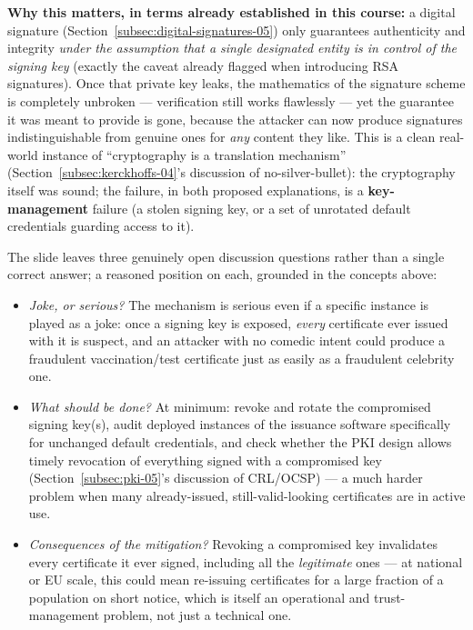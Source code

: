 \documentclass[12pt, a4paper]{article}
\begin{document}
\textcolor{red!70!black}{\textbf{Why this matters, in terms already established in this course:}} a digital signature (Section~\ref{subsec:digital-signatures-05}) only guarantees authenticity and integrity \emph{under the assumption that a single designated entity is in control of the signing key} (exactly the caveat already flagged when introducing RSA signatures). Once that private key leaks, the mathematics of the signature scheme is completely unbroken --- verification still works flawlessly --- yet the guarantee it was meant to provide is gone, because the attacker can now produce signatures indistinguishable from genuine ones for \emph{any} content they like. This is a clean real-world instance of ``cryptography is a translation mechanism'' (Section~\ref{subsec:kerckhoffs-04}'s discussion of no-silver-bullet): the cryptography itself was sound; the failure, in both proposed explanations, is a \textbf{key-management} failure (a stolen signing key, or a set of unrotated default credentials guarding access to it).

The slide leaves three genuinely open discussion questions rather than a single correct answer; a reasoned position on each, grounded in the concepts above:
\begin{itemize}
    \item \textit{Joke, or serious?} The mechanism is serious even if a specific instance is played as a joke: once a signing key is exposed, \emph{every} certificate ever issued with it is suspect, and an attacker with no comedic intent could produce a fraudulent vaccination/test certificate just as easily as a fraudulent celebrity one.
    \item \textit{What should be done?} At minimum: revoke and rotate the compromised signing key(s), audit deployed instances of the issuance software specifically for unchanged default credentials, and check whether the PKI design allows timely revocation of everything signed with a compromised key (Section~\ref{subsec:pki-05}'s discussion of CRL/OCSP) --- a much harder problem when many already-issued, still-valid-looking certificates are in active use.
    \item \textit{Consequences of the mitigation?} Revoking a compromised key invalidates every certificate it ever signed, including all the \emph{legitimate} ones --- at national or EU scale, this could mean re-issuing certificates for a large fraction of a population on short notice, which is itself an operational and trust-management problem, not just a technical one.
\end{itemize}
\end{document}
